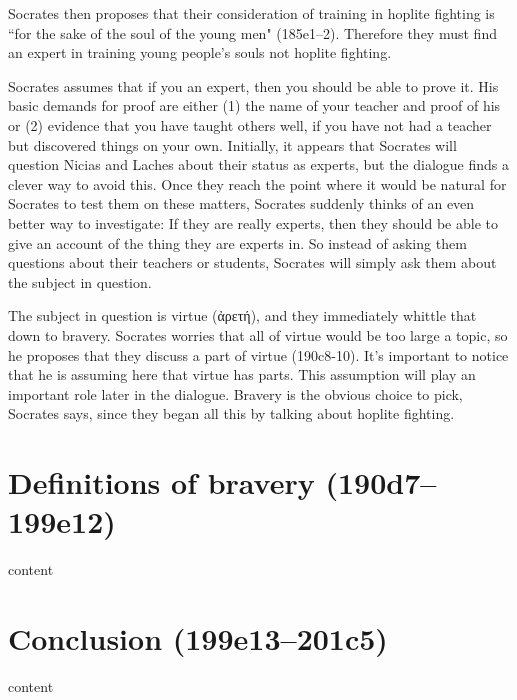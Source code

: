 \documentclass[11pt]{article}
\begin{document}
Socrates then proposes that their consideration of training in hoplite fighting is ``for the sake of the soul of the young men" (185e1--2).  Therefore they must find an expert in training young people's souls not hoplite fighting.

Socrates assumes that if you an expert, then you should be able to prove it.  His basic demands for proof are either (1) the name of your teacher and proof of his  or (2) evidence that you have taught others well, if you have not had a teacher but discovered things on your own.  Initially, it appears that Socrates will question Nicias and Laches about their status as experts, but the dialogue finds a clever way to avoid this.  Once they reach the point where it would be natural for Socrates to test them on these matters, Socrates suddenly thinks of an even better way to investigate: If they are really experts, then they should be able to give an account of the thing they are experts in.  So instead of asking them questions about their teachers or students, Socrates will simply ask them about the subject in question.

The subject in question is virtue (ἀρετή), and they immediately whittle that down to bravery.  Socrates worries that all of virtue would be too large a topic, so he proposes that they discuss a part of virtue (190c8-10).  It's important to notice that he is assuming here that virtue has parts.  This assumption will play an important role later in the dialogue.  Bravery is the obvious choice to pick, Socrates says, since they began all this by talking about hoplite fighting.

\section{Definitions of bravery (190d7--199e12)}

content

\section{Conclusion (199e13--201c5)}

content


\newpage


\end{document}
